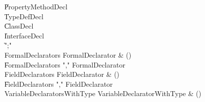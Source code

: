 \begin{bbgrammar}
    \| PropertyMethodDecl\\
    \| TypeDefDecl\\
    \| ClassDecl\\
    \| InterfaceDecl\\
    \| \xcd";"\\
 FormalDeclarators  \label{prod:FormalDeclarators}  \: FormalDeclarator & ()\\
    \| FormalDeclarators \xcd"," FormalDeclarator\\
 FieldDeclarators  \label{prod:FieldDeclarators}  \: FieldDeclarator & ()\\
    \| FieldDeclarators \xcd"," FieldDeclarator\\
 VariableDeclaratorsWithType  \label{prod:VariableDeclaratorsWithType}  \: VariableDeclaratorWithType & ()\\
\end{bbgrammar}

